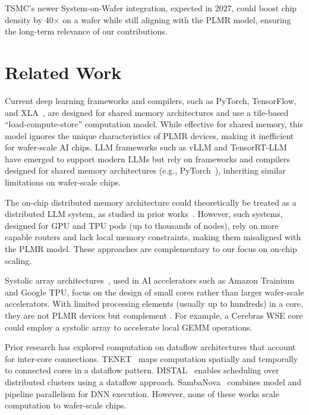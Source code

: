 TSMC’s newer System-on-Wafer integration, expected in 2027, could boost chip density by 40$\times$ on a wafer while still aligning with the PLMR model, ensuring the long-term relevance of our contributions. 

\vspace{-0.2cm}
\section{Related Work}
\vspace{-0.2cm}

Current deep learning frameworks and compilers, such as PyTorch, TensorFlow, and XLA~\cite{pytorch, tensorflow, xla,flextensor, tvm, ansor, roller, rammer, welder, ladder}, are designed for shared memory architectures and use a tile-based “load-compute-store” computation model. While effective for shared memory, this model ignores the unique characteristics of PLMR devices, making it inefficient for wafer-scale AI chips. LLM frameworks such as vLLM and TensorRT-LLM~\cite{vllm,tensorrt-llm} have emerged to support modern LLMs but rely on frameworks and compilers designed for shared memory architectures (e.g., PyTorch~\cite{pytorch}), inheriting similar limitations on wafer-scale chips.

 The on-chip distributed memory architecture could theoretically be treated as a distributed LLM system, as studied in prior works~\cite{alpa, alpaserver, vllm, google2023efficiently, tensorrt-llm, loongserve}. However, such systems, designed for GPU and TPU pods (up to thousands of nodes), rely on more capable routers and lack local memory constraints, making them misaligned with the PLMR model. These approaches are complementary to our focus on on-chip scaling.

 Systolic array architectures~\cite{resa}, used in AI accelerators such as Amazon Trainium and Google TPU, focus on the design of small cores rather than larger wafer-scale accelerators. With limited processing elements (usually up to hundreds) in a core, they are not PLMR devices but complement \sys. For example, a Cerebras WSE core could employ a systolic array to accelerate local GEMM operations.

Prior research has explored computation on dataflow architectures that account for inter-core connections. TENET~\cite{tenet} maps computation spatially and temporally to connected cores in a dataflow pattern. DISTAL~\cite{distal} enables scheduling over distributed clusters using a dataflow approach. SambaNova~\cite{sambanova} combines model and pipeline parallelism for DNN execution. However, none of these works scale computation to wafer-scale chips.

